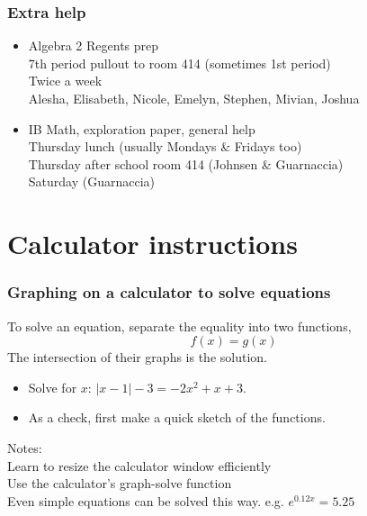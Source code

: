 \documentclass{beamer}
\begin{document}
\frame
{
  \frametitle{Extra help}
\begin{itemize}
      \item Algebra 2 Regents prep\\
      7th period pullout to room 414 (sometimes 1st period)\\
      Twice a week\\
      Alesha, Elisabeth, Nicole, Emelyn, Stephen, Mivian, Joshua\\[20pt]
      \item IB Math, exploration paper, general help\\
      Thursday lunch (usually Mondays \& Fridays too)\\
      Thursday after school room 414 (Johnsen \& Guarnaccia)\\
      Saturday (Guarnaccia)
\end{itemize}
 }

\section{Calculator instructions}
\frame
{
  \frametitle{Graphing on a calculator to solve equations}

\begin{block}{To solve an equation, separate the equality into two functions, \[f(x)=g(x)\]The intersection of their graphs is the solution.}
  \begin{itemize}
      \item Solve for $x$: $|x-1|-3 = -2x^2+x+3$.
      \item As a check, first make a quick sketch of the functions.
  \end{itemize}
  \end{block}
  Notes: \\Learn to resize the calculator window efficiently\\
  Use the calculator's graph-solve function\\
  Even simple equations can be solved this way. e.g. $e^{0.12x} = 5.25$
}
\end{document}
